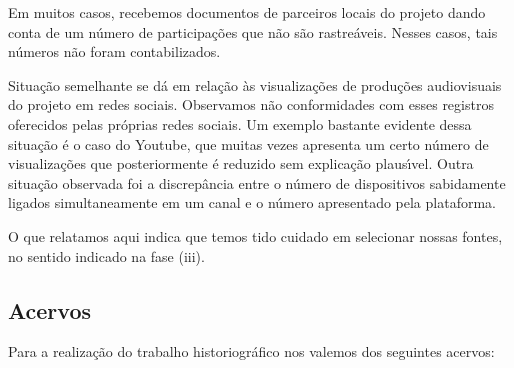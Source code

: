 \documentclass[
12pt,		%
openright,	%
twoside,  %
a4paper,			%
chapter=TITLE,		%
english,			%
french,				%
spanish,			%
brazil				%
]{USPSC-classe/USPSC}
\begin{document}
Em muitos casos, recebemos documentos de parceiros locais do projeto dando conta de um n\'umero de participa\c{c}\~oes que n\~ao s\~ao rastre\'aveis. Nesses casos, tais n\'umeros n\~ao foram contabilizados.

















Situa\c{c}\~ao semelhante se d\'a em rela\c{c}\~ao \`as visualiza\c{c}\~oes de produ\c{c}\~oes audiovisuais do projeto em redes sociais. Observamos n\~ao conformidades com esses registros oferecidos pelas pr\'oprias redes sociais. Um exemplo bastante evidente dessa situa\c{c}\~ao \'e o caso do Youtube, que muitas vezes apresenta um certo n\'umero de visualiza\c{c}\~oes que posteriormente \'e reduzido sem explica\c{c}\~ao plaus\'{\i}vel. Outra situa\c{c}\~ao observada foi a discrep\^ancia entre o n\'umero de dispositivos sabidamente ligados simultaneamente em um canal e o n\'umero apresentado pela plataforma.

















O que relatamos aqui indica que temos tido cuidado em selecionar nossas fontes, no sentido indicado na fase (iii).

















\subsection[Acervos]{Acervos}\label{Acervos}
Para a realiza\c{c}\~ao do trabalho historiogr\'afico nos valemos dos seguintes acervos:
\end{document}

